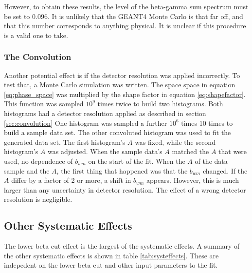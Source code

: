 \documentclass[main.tex]{subfiles}
\begin{document}
However, to obtain these results, the level of the beta-gamma sum spectrum must be set to 0.096. 
It is unlikely that the GEANT4 Monte Carlo is that far off, and that this number corresponds to anything physical.
It is unclear if this procedure is a valid one to take.

\subsubsection{The Convolution}

Another potential effect is if the detector resolution was applied incorrectly.
To test that, a Monte Carlo simulation was written.
The space space in equation \ref{eq:phase_space} was multiplied by the shape factor in equation \ref{eq:shapefactor}.
This function was sampled $10^{9}$ times twice to build two histograms. 
Both histograms had a detector resolution applied as described in section \ref{sec:convolution}
One histogram was sampled a further $10^{6}$ times 10 times to build a sample data set.
The other convoluted histogram was used to fit the generated data set.
The first histogram's $A$ was fixed, while the second histogram's $A$ was adjusted.
When the sample data's $A$ matched the $A$ that were used, no dependence of $b_{wm}$ on the start of the fit.
When the $A$ of the data sample and the $A$, the first thing that happened was that the $b_{wm}$ changed.
If the $A$ differ by a factor of 2 or more, a shift in $b_{wm}$ appears.
However, this is much larger than any uncertainty in detector resolution.
The effect of a wrong detector resolution is negligible. 

\subsection{Other Systematic Effects}

The lower beta cut effect is the largest of the systematic effects.
A summary of the other systematic effects is shown in table \ref{tab:systeffects}.
These are indepedent on the lower beta cut and other input parameters to the fit.

 
\end{document}
